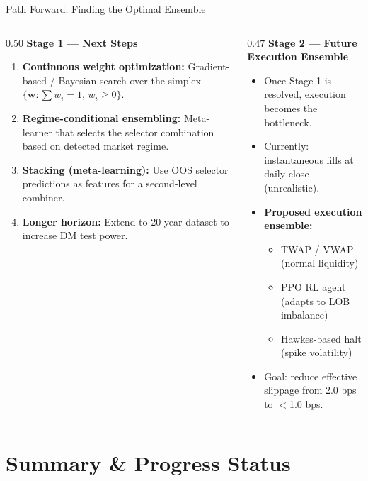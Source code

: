 \documentclass[aspectratio=169,10pt]{beamer}
\begin{document}
\begin{frame}{Path Forward: Finding the Optimal Ensemble}
  \begin{columns}[T]
    \begin{column}{0.50\textwidth}
      \textbf{Stage 1 --- Next Steps}
      \begin{enumerate}\itemsep4pt
        \item \textbf{Continuous weight optimization:} Gradient-based / Bayesian search over the simplex $\{\mathbf{w}:\sum w_i=1,\, w_i\ge 0\}$.
        \item \textbf{Regime-conditional ensembling:} Meta-learner that selects the selector combination based on detected market regime.
        \item \textbf{Stacking (meta-learning):} Use OOS selector predictions as features for a second-level combiner.
        \item \textbf{Longer horizon:} Extend to 20-year dataset to increase DM test power.
      \end{enumerate}
    \end{column}
    \begin{column}{0.47\textwidth}
      \textbf{Stage 2 --- Future Execution Ensemble}
      \begin{itemize}\itemsep4pt
        \item Once Stage 1 is resolved, execution becomes the bottleneck.
        \item Currently: instantaneous fills at daily close (unrealistic).
        \item \textbf{Proposed execution ensemble:}
          \begin{itemize}\itemsep2pt
            \item TWAP / VWAP (normal liquidity)
            \item PPO RL agent (adapts to LOB imbalance)
            \item Hawkes-based halt (spike volatility)
          \end{itemize}
        \item Goal: reduce effective slippage from 2.0 bps to $<$1.0 bps.
      \end{itemize}
    \end{column}
  \end{columns}
\end{frame}

\section{Summary \& Progress Status}
\end{document}
